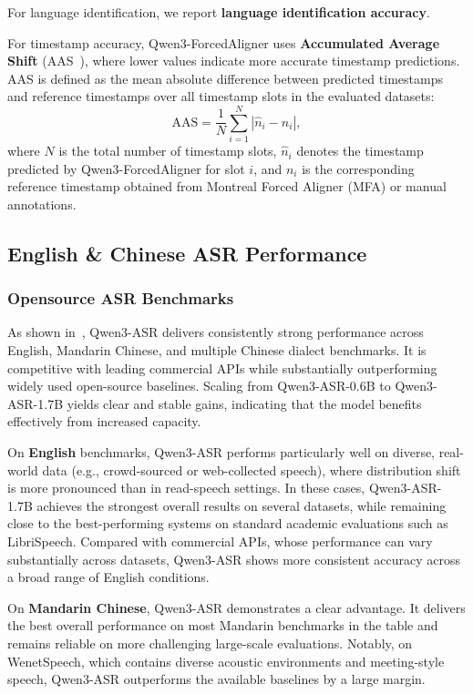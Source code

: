 For language identification, we report \textbf{language identification accuracy}.

For timestamp accuracy, Qwen3-ForcedAligner uses \textbf{Accumulated Average Shift} (AAS~\cite{shi2023achieving}), where lower values indicate more accurate timestamp predictions. AAS is defined as the mean absolute difference between predicted timestamps and reference timestamps over all timestamp slots in the evaluated datasets:
\begin{equation}
    \mathrm{AAS}=\frac{1}{N}\sum_{i=1}^{N}\left|\hat{n}_i-n_i\right|,
\end{equation}
where $N$ is the total number of timestamp slots, $\hat{n}_i$ denotes the timestamp predicted by Qwen3-ForcedAligner for slot $i$, and $n_i$ is the corresponding reference timestamp obtained from Montreal Forced Aligner (MFA) or manual annotations.


\subsection{English \& Chinese ASR Performance}
\subsubsection{Opensource ASR Benchmarks}

As shown in~, Qwen3-ASR delivers consistently strong performance across English, Mandarin Chinese, and multiple Chinese dialect benchmarks. It is competitive with leading commercial APIs while substantially outperforming widely used open-source baselines. Scaling from Qwen3-ASR-0.6B to Qwen3-ASR-1.7B yields clear and stable gains, indicating that the model benefits effectively from increased capacity.

On \textbf{English} benchmarks, Qwen3-ASR performs particularly well on diverse, real-world data (e.g., crowd-sourced or web-collected speech), where distribution shift is more pronounced than in read-speech settings. In these cases, Qwen3-ASR-1.7B achieves the strongest overall results on several datasets, while remaining close to the best-performing systems on standard academic evaluations such as LibriSpeech. Compared with commercial APIs, whose performance can vary substantially across datasets, Qwen3-ASR shows more consistent accuracy across a broad range of English conditions.

On \textbf{Mandarin Chinese}, Qwen3-ASR demonstrates a clear advantage. It delivers the best overall performance on most Mandarin benchmarks in the table and remains reliable on more challenging large-scale evaluations. Notably, on WenetSpeech, which contains diverse acoustic environments and meeting-style speech, Qwen3-ASR outperforms the available baselines by a large margin.

